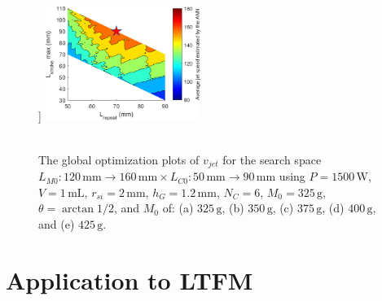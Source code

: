 \begin{figure}[!ht]
                ]{
                    \includegraphics[width=0.45\textwidth]{chap4/images2/400g.png}
                    \label{fig:chapter/rsm/LFSM/optimization/400}
                }
                \\
                \\
                \caption{
                    The global optimization plots of $v_{jet}$ for the search space $L_{M0}:120\,\mathrm{mm}\rightarrow 160\,\mathrm{mm} \times L_{C0}:50\,\mathrm{mm}\rightarrow 90\,\mathrm{mm}$ using $P=1500\,\mathrm{W}$, $V=1\,\mathrm{mL}$, $r_{si}=2\,\mathrm{mm}$, $h_G=1.2\,\mathrm{mm}$, $N_C=6$, $M_0=325\,\mathrm{g}$, $\theta = \arctan{1/2}$,  and $M_0$ of: (a) $325\,\mathrm{g}$, (b) $350\,\mathrm{g}$, (c) $375\,\mathrm{g}$, (d) $400\,\mathrm{g}$, and (e) $425\,\mathrm{g}$.
                }   \label{fig:chapter/rsm/LFSM/optimization search space result for differnt mass}
            \end{figure}
    
    
    \section{Application to \ac{LTFM}}               \label{Chapter:RSM/LTFM}
    
